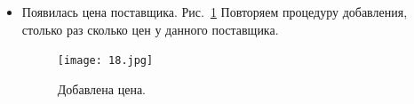 \begin{itemize}
  	\item Появилась цена поставщика.  Рис.~\ref{ris:18.jpg}
  	Повторяем процедуру добавления, столько раз сколько цен у данного поставщика.
  \begin{figure}[H]
  	\texttt{[image: 18.jpg]}
  	\caption{Добавлена цена.}
  	\label{ris:18.jpg}
  \end{figure}  
  
  
  
\end{itemize}

%
